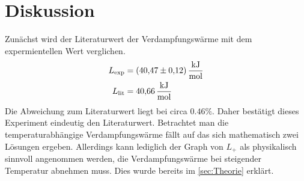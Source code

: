 \section{Diskussion}
\label{sec:Diskussion}
Zunächst wird der Literaturwert \cite{Ingenieurwissen} der Verdampfungswärme mit dem expermientellen Wert verglichen. 
\begin{align*}
    L_\text{exp} &= \qty{40.47 +- 0.12}{\kilo\joule\per\mol} \\
    L_\text{lit} &= \qty{40.66}{\kilo\joule\per\mol}
\end{align*}
Die Abweichung zum Literaturwert liegt bei circa $0.46\%$. Daher bestätigt dieses Experiment eindeutig den Literaturwert. 
Betrachtet man die temperaturabhängige Verdampfungswärme fällt auf das sich mathematisch zwei Lösungen ergeben. Allerdings kann lediglich der Graph von $L_+$ als physikalisch sinnvoll angenommen
werden, die Verdampfungswärme bei steigender Temperatur abnehmen muss. Dies wurde bereits im \autoref{sec:Theorie} erklärt. 
